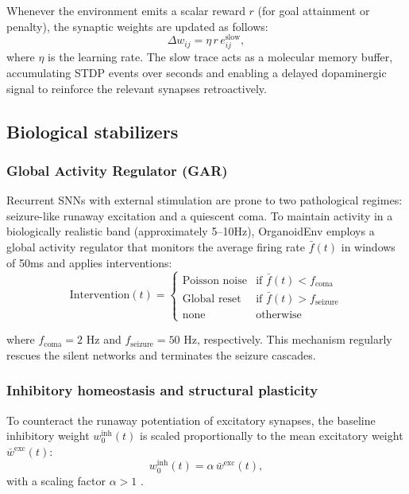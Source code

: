 \documentclass[journal]{IEEEtran}
\begin{document}
Whenever the environment emits a scalar reward $r$ (for goal attainment or penalty), the synaptic weights are updated as follows:
\begin{equation}
\Delta w_{ij} = \eta\, r\, e_{ij}^{\mathrm{slow}},
\label{eq:weight_update}
\end{equation}
where $\eta$ is the learning rate. 
The slow trace acts as a molecular memory buffer, accumulating STDP events over seconds and enabling a delayed dopaminergic signal to reinforce the relevant synapses retroactively.

\subsection{Biological stabilizers}

\subsubsection{Global Activity Regulator (GAR)}
Recurrent SNNs with external stimulation are prone to two pathological regimes: seizure-like runaway excitation and a quiescent coma. 
To maintain activity in a biologically realistic band (approximately 5--10Hz), OrganoidEnv employs a global activity regulator that monitors the average firing rate $\bar{f}(t)$ in windows of 50ms and applies interventions:
\begin{equation}
\text{Intervention}(t) = 
\begin{cases} 
\text{Poisson noise} & \text{if } \bar{f}(t) < f_{\text{coma}} \\
\text{Global reset} & \text{if } \bar{f}(t) > f_{\text{seizure}} \\
\text{none} & \text{otherwise}
\end{cases}
\label{eq:gar_intervention}
\end{equation} 

where $f_{\text{coma}} = 2$ Hz and $f_{\text{seizure}} = 50$ Hz, respectively.
This mechanism regularly rescues the silent networks and terminates the seizure cascades.

\subsubsection{Inhibitory homeostasis and structural plasticity}
To counteract the runaway potentiation of excitatory synapses, the baseline inhibitory weight $w_0^{\mathrm{inh}}(t)$ is scaled proportionally to the mean excitatory weight $\bar{w}^{\mathrm{exc}}(t)$:
\begin{equation}
w_0^{\mathrm{inh}}(t) = \alpha\, \bar{w}^{\mathrm{exc}}(t),
\end{equation}
with a scaling factor $\alpha > 1$ \cite{HomeostaticSTDP2010,Turrigiano2008SelfTuning}. 
\end{document}
